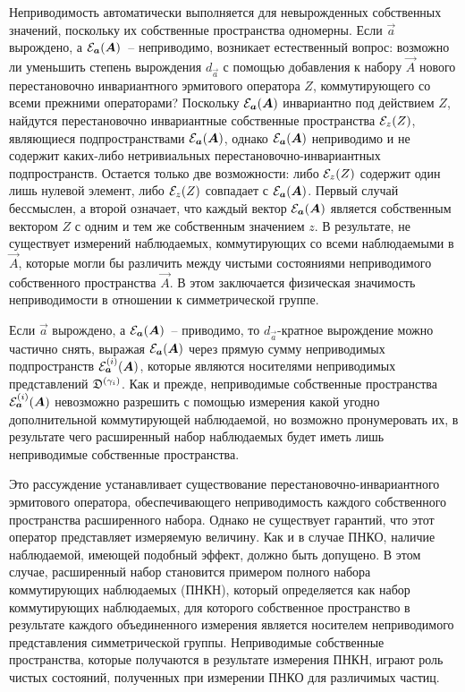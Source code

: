 \documentclass[a4paper, 12pt]{article}
\begin{document}
Неприводимость автоматически выполняется для невырожденных собственных 
значений, поскольку их собственные пространства одномерны. Если 
$\vec{a}$ вырождено, а ${\mathcal{E}}_{\boldsymbol{a}}{}({\boldsymbol{A}}{})$~-- неприводимо, возникает 
естественный вопрос: возможно ли уменьшить степень вырождения 
$d_\vec{a}$ с помощью добавления к набору $\vec{A}$ нового 
перестановочно инвариантного эрмитового оператора $Z$, коммутирующего со 
всеми прежними операторами? Поскольку ${\mathcal{E}}_{\boldsymbol{a}}{}({\boldsymbol{A}}{})$ инвариантно 
под действием $Z$, найдутся перестановочно инвариантные собственные 
пространства ${\mathcal{E}}_z(Z)$, являющиеся подпространствами 
${\mathcal{E}}_{\boldsymbol{a}}{}({\boldsymbol{A}}{})$, однако ${\mathcal{E}}_{\boldsymbol{a}}{}({\boldsymbol{A}}{})$ неприводимо и не 
содержит каких-либо нетривиальных перестановочно-инвариантных 
подпространств. Остается только две возможности: либо ${\mathcal{E}}_z(Z)$ содержит 
один лишь нулевой элемент, либо ${\mathcal{E}}_z(Z)$ совпадает 
с ${\mathcal{E}}_{\boldsymbol{a}}{}({\boldsymbol{A}}{})$. Первый случай бессмыслен, а второй означает, 
что каждый вектор ${\mathcal{E}}_{\boldsymbol{a}}{}({\boldsymbol{A}}{})$ является собственным вектором 
$Z$ с одним  и тем же собственным значением $z$. В результате, не 
существует измерений наблюдаемых, коммутирующих со всеми наблюдаемыми 
в $\vec{A}$, которые могли бы различить между чистыми состояниями 
неприводимого собственного пространства $\vec{A}$. В этом заключается 
физическая значимость неприводимости в отношении к симметрической 
группе.

Если $\vec{a}$ вырождено, а ${\mathcal{E}}_{\boldsymbol{a}}{}({\boldsymbol{A}}{})$~-- приводимо, то 
$d_\vec{a}$-кратное вырождение можно частично снять, выражая 
${\mathcal{E}}_{\boldsymbol{a}}{}({\boldsymbol{A}}{})$ через прямую сумму неприводимых подпространств 
${\mathcal{E}}^{(i)}_{\boldsymbol{a}}{}({\boldsymbol{A}}{})$, которые являются носителями неприводимых 
представлений ${\mathfrak{D}^{(\gamma_i)}}{}$. Как и прежде, неприводимые собственные 
пространства ${\mathcal{E}}^{(i)}_{\boldsymbol{a}}{}({\boldsymbol{A}}{})$ невозможно разрешить с помощью 
измерения какой угодно дополнительной коммутирующей наблюдаемой, но 
возможно пронумеровать их, в результате чего расширенный набор 
наблюдаемых будет иметь лишь неприводимые собственные пространства.

Это рассуждение устанавливает существование перестановочно-инвариантного 
эрмитового оператора, обеспечивающего неприводимость каждого 
собственного пространства расширенного набора. Однако не существует 
гарантий, что этот оператор представляет измеряемую величину. Как 
и в случае ПНКО, наличие наблюдаемой, имеющей подобный эффект, должно 
быть допущено. В этом случае, расширенный набор становится примером 
полного набора коммутирующих наблюдаемых (ПНКН), который определяется 
как набор коммутирующих наблюдаемых, для которого собственное 
пространство в результате каждого объединенного измерения является 
носителем неприводимого представления симметрической группы. 
Неприводимые собственные пространства, которые получаются в результате 
измерения ПНКН, играют роль чистых состояний, полученных при измерении 
ПНКО для различимых частиц.
\end{document}
